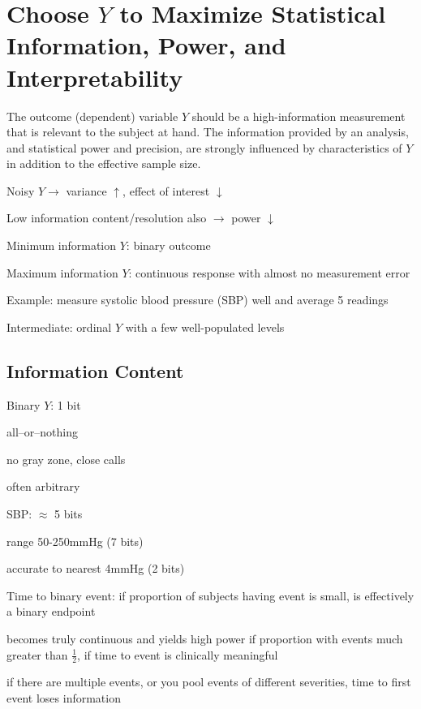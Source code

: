 \section{Choose $Y$ to Maximize Statistical Information, Power, and Interpretability}  
The outcome (dependent) variable $Y$ should be a high-information
measurement that is relevant to the subject at hand.  The information
provided by an analysis, and statistical power and precision, are
strongly influenced by characteristics of $Y$ in addition to the
effective sample size.
  \bi
  \item Noisy $Y \rightarrow$ variance $\uparrow$, effect of
    interest $\downarrow$
  \item Low information content/resolution also $\rightarrow$ power
    $\downarrow$ 
  \item Minimum information $Y$: binary outcome
  \item Maximum information $Y$: continuous response with almost no
    measurement error
    \bi
    \item Example: measure systolic blood pressure (SBP) well and
      average 5 readings 
    \ei
  \item Intermediate: ordinal $Y$ with a few well-populated levels
  \ei

\subsection{Information Content}
  \bi
  \item Binary $Y$: 1 bit
    \bi
    \item all--or--nothing
    \item no gray zone, close calls
    \item often arbitrary
    \ei
  \item SBP: $\approx$ 5 bits
    \bi
    \item range 50-250mmHg (7 bits)
    \item accurate to nearest 4mmHg (2 bits)
    \ei
  \item Time to binary event: if proportion of subjects having event is
    small, is effectively a binary endpoint
    \bi
    \item becomes truly continuous and yields high power if proportion
      with events much greater than $\frac{1}{2}$, if time to event is
      clinically meaningful
    \item if there are multiple events, or you pool events of
      different severities, time to first event loses information
    \ei
  \ei
  

